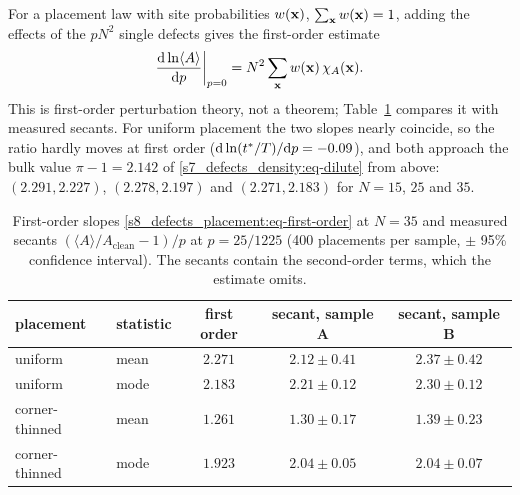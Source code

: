 For a placement law with site probabilities $w(\mathbf{x})$, $\sum_{\mathbf{x}}w(\mathbf{x})=1$, adding the effects of the $pN^{2}$
single defects gives the first-order estimate
\begin{equation}\label{s8_defects_placement:eq-first-order}
  \frac{\mathrm{d}\ln\langle A\rangle}{\mathrm{d} p}\bigg|_{p=0}=N^{2}\sum_{\mathbf{x}}w(\mathbf{x})\,\chi_A(\mathbf{x}).
\end{equation}
This is first-order perturbation theory, not a theorem; Table~\ref{s8_defects_placement:tab-slopes} compares it
with measured secants. For uniform placement the two slopes nearly coincide, so the ratio hardly moves at first
order ($\mathrm{d}\ln(t^{*}/T)/\mathrm{d} p=-0.09$), and both approach the bulk value $\pi-1=2.142$ of
\eqref{s7_defects_density:eq-dilute} from above: $(2.291,2.227)$, $(2.278,2.197)$ and $(2.271,2.183)$ for
$N=15$, $25$ and $35$.

\begin{table}[tbp]
\centering
\caption{First-order slopes \eqref{s8_defects_placement:eq-first-order} at $N=35$ and measured secants
$(\langle A\rangle/A_{\mathrm{clean}}-1)/p$ at $p=25/1225$ (400 placements per sample, $\pm$ 95\% confidence
interval). The secants contain the second-order terms, which the estimate omits.}
\label{s8_defects_placement:tab-slopes}
\begin{tabular}{llccc}
\toprule
placement & statistic & first order & secant, sample A & secant, sample B\\
\midrule
uniform        & mean & $2.271$ & $2.12\pm0.41$ & $2.37\pm0.42$\\
uniform        & mode & $2.183$ & $2.21\pm0.12$ & $2.30\pm0.12$\\
corner-thinned & mean & $1.261$ & $1.30\pm0.17$ & $1.39\pm0.23$\\
corner-thinned & mode & $1.923$ & $2.04\pm0.05$ & $2.04\pm0.07$\\
\bottomrule
\end{tabular}
\end{table}

